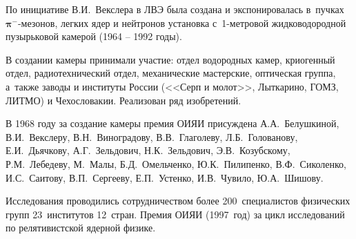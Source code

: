 \documentclass{slides}
\begin{document}
\bfseries

По инициативе В.И.~Векслера в ЛВЭ была создана и экспонировалась в~пучках
\linebreak $\boldsymbol\pi^{\boldsymbol -}$-мезонов, легких ядер и нейтронов
установка с~1-метровой жидководородной \linebreak пузырьковой камерой
(1964 -- 1992 годы).

В создании камеры принимали участие: отдел водородных камер, криогенный
\linebreak отдел, радиотехнический отдел, механические мастерские, оптическая
группа, \linebreak а~также заводы и институты России (<<Серп и молот>>,
Лыткарино, ГОМЗ, \linebreak ЛИТМО) и Чехословакии. Реализован ряд изобретений.

В 1968 году за создание камеры премия ОИЯИ присуждена А.А.~Белушкиной,
\linebreak В.И.~Векслеру, В.Н.~Виноградову, В.В.~Глаголеву, Л.Б.~Голованову,
Е.И.~Дьячкову, \linebreak А.Г.~Зельдович, Н.К.~Зельдович, Э.В.~Козубскому,
Р.М.~Лебедеву, М.~Малы, \linebreak Б.Д.~Омельченко, Ю.К.~Пилипенко,
В.Ф.~Сиколенко, И.С.~Саитову, В.П.~Сергееву, Е.П.~Устенко, И.В.~Чувило,
Ю.А.~Шишову.

Исследования проводились сотрудничеством более 200~специалистов физических
групп 23~институтов 12~стран. Премия ОИЯИ (1997~год) за цикл исследований
по релятивистской ядерной физике.

\vspace{2ex}
\def\UrlFont{\ttfamily\large}
\end{document}
